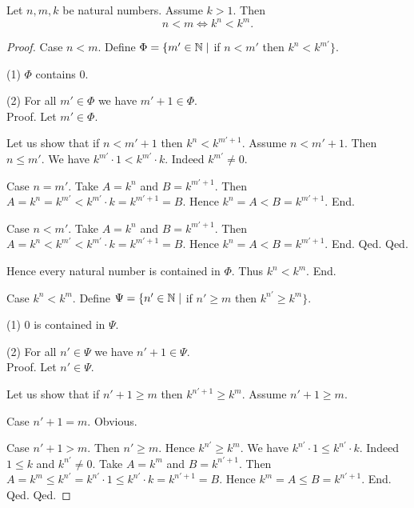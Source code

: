\documentclass[10pt]{article}
\begin{document}
  \begin{forthel}
    \begin{proposition}
      Let $n, m, k$ be natural numbers.
      Assume $k > 1$.
      Then \[ n < m \iff k^{n} < k^{m}. \]
    \end{proposition}
    \begin{proof}
      Case $n < m$.
        Define $\Phi = \{ m' \in \mathbb{N} \mid$ if $n < m'$ then
        $k^{n} < k^{m'} \}$.

        (1) $\Phi$ contains $0$.

        (2) For all $m' \in \Phi$ we have $m' + 1 \in \Phi$. \\
        Proof.
          Let $m' \in \Phi$.

          Let us show that if $n < m' + 1$ then $k^{n} < k^{m' + 1}$.
            Assume $n < m' + 1$.
            Then $n \leq m'$.
            We have $k^{m'} \cdot 1 < k^{m'} \cdot k$.
            Indeed $k^{m'} \neq 0$.

            Case $n = m'$.
              Take $A = k^{n}$ and $B = k^{m' + 1}$. %
              Then $A
                = k^{n}
                = k^{m'}
                < k^{m'} \cdot k
                = k^{m' + 1}
                = B$.
              Hence $k^{n} = A < B = k^{m' + 1}$.
            End.

            Case $n < m'$.
              Take $A = k^{n}$ and $B = k^{m' + 1}$. %
              Then $A
                = k^{n}
                < k^{m'}
                < k^{m'} \cdot k
                = k^{m' + 1}
                = B$.
              Hence $k^{n} = A < B = k^{m' + 1}$.
            End.
          Qed.
        Qed.

        Hence every natural number is contained in $\Phi$.
        Thus $k^{n} < k^{m}$.
      End.

      Case $k^{n} < k^{m}$.
        Define $\Psi = \{ n' \in \mathbb{N} \mid$ if $n' \geq m$ then
        $k^{n'} \geq k^{m} \}$.

        (1) $0$ is contained in $\Psi$.

        (2) For all $n' \in \Psi$ we have $n' + 1 \in \Psi$. \\
        Proof.
          Let $n' \in \Psi$.

          Let us show that if $n' + 1 \geq m$ then $k^{n' + 1} \geq k^{m}$.
            Assume $n' + 1 \geq m$.

            Case $n' + 1 = m$. Obvious.

            Case $n' + 1 > m$.
              Then $n' \geq m$.
              Hence $k^{n'} \geq k^{m}$.
              We have $k^{n'} \cdot 1 \leq k^{n'} \cdot k$.
              Indeed $1 \leq k$ and $k^{n'} \neq 0$.
              Take $A = k^{m}$ and $B = k^{n' + 1}$. %
              Then $A
                = k^{m}
                \leq k^{n'}
                = k^{n'} \cdot 1
                \leq k^{n'} \cdot k
                = k^{n' + 1}
                = B$.
              Hence $k^{m} = A \leq B = k^{n' + 1}$.
            End.
          Qed.
        Qed.


\end{proof}
\end{forthel}
\end{document}
